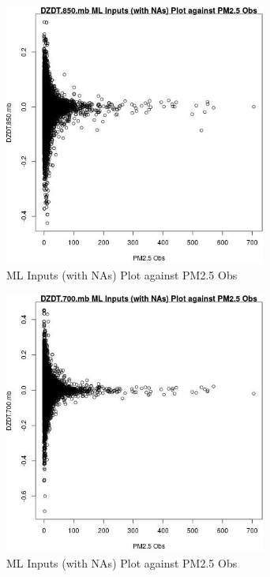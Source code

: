 \begin{figure} 
\centering  
\includegraphics[width=0.77\textwidth]{Code_Outputs/Report_ML_input_PM25_Step4_part_e_de_duplicated_aves_compiled_2019-05-14wNAs_DZDT850mbvPM25_Obs.jpg} 
\caption{\label{fig:Report_ML_input_PM25_Step4_part_e_de_duplicated_aves_compiled_2019-05-14wNAsDZDT850mbvPM25_Obs}ML Inputs (with NAs) Plot against PM2.5 Obs} 
\end{figure} 
 

\begin{figure} 
\centering  
\includegraphics[width=0.77\textwidth]{Code_Outputs/Report_ML_input_PM25_Step4_part_e_de_duplicated_aves_compiled_2019-05-14wNAs_DZDT700mbvPM25_Obs.jpg} 
\caption{\label{fig:Report_ML_input_PM25_Step4_part_e_de_duplicated_aves_compiled_2019-05-14wNAsDZDT700mbvPM25_Obs}ML Inputs (with NAs) Plot against PM2.5 Obs} 
\end{figure} 
 

